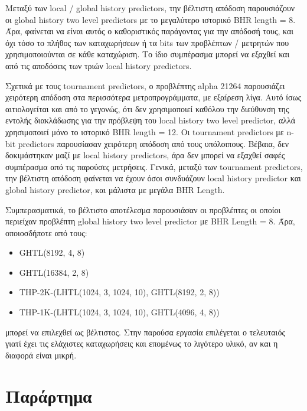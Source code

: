 \documentclass{article}
\newcommand{\eng}[1]{\foreignlanguage{english}{#1}}
\begin{document}
Μεταξύ των \eng{local / global history predictors}, την βέλτιστη απόδοση παρουσιάζουν οι \eng{global history two level predictors} με το μεγαλύτερο ιστορικό \eng{BHR length = 8}. Άρα, φαίνεται να είναι αυτός ο καθοριστικός παράγοντας για την απόδοσή τους, και όχι τόσο το πλήθος των καταχωρήσεων ή τα \eng{bits} των προβλέπτων / μετρητών που χρησιμοποιούνται σε κάθε καταχώριση. Το ίδιο συμπέρασμα μπορεί να εξαχθεί και από τις αποδόσεις των τριών \eng{local history predictors}.  

Σχετικά με τους \eng{tournament predictors}, ο προβλέπτης \eng{alpha 21264} παρουσιάζει χειρότερη απόδοση στα περισσότερα μετροπρογράμματα, με εξαίρεση λίγα. Αυτό ίσως αιτιολογείται και από το γεγονώς, ότι δεν χρησιμοποιεί καθόλου την διεύθυνση της εντολής διακλάδωσης για την πρόβλεψη του \eng{local history two level predictor}, αλλά χρησιμοποιεί μόνο το ιστορικό \eng{BHR length = 12}. Οι \eng{tournament predictors} με \eng{n-bit predictors} παρουσίασαν χειρότερη απόδοση από τους υπόλοιπους. Βέβαια, δεν δοκιμάστηκαν μαζί με \eng{local history predictors}, άρα δεν μπορεί να εξαχθεί σαφές συμπέρασμα από τις παρούσες μετρήσεις. Γενικά, μεταξύ των \eng{tournament predictors}, την βέλτιστη απόδοση φαίνεται να έχουν όσοι συνδυάζουν \eng{local history predictor} και \eng{global history predictor}, και μάλιστα με μεγάλα \eng{BHR Length}.

Συμπερασματικά, το βέλτιστο αποτέλεσμα παρουσιάσαν οι προβλέπτες οι οποίοι περιείχαν προβλέπτη \eng{global history two level predictor} με \eng{BHR Length = 8}. Άρα, οποιοσδήποτε από τους:

\begin{itemize}
    \item \eng{GHTL(8192, 4, 8)}
    \item \eng{GHTL(16384, 2, 8)}
    \item \eng{THP-2K-(LHTL(1024, 3, 1024, 10), GHTL(8192, 2, 8))}
    \item \eng{THP-1K-(LHTL(1024, 3, 1024, 10), GHTL(4096, 4, 8))}
\end{itemize} μπορεί να επιλεχθεί ως βέλτιστος. Στην παρούσα εργασία επιλέγεται ο τελευταιός γιατί έχει τις ελάχιστες καταχωρήσεις και επομένως το λιγότερο υλικό, αν και η διαφορά είναι μικρή. 

\clearpage
\section{Παράρτημα}
\end{document}

